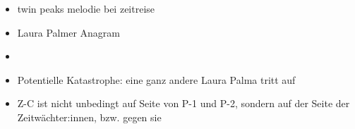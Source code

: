 \begin{itemize}
  \item twin peaks melodie bei zeitreise
  \item Laura Palmer Anagram
  \item {}
  \item Potentielle Katastrophe: eine ganz andere Laura Palma tritt auf
  \item Z-C ist nicht unbedingt auf Seite von P-1 und P-2, sondern auf der Seite der Zeitwächter:innen, bzw. gegen sie
\end{itemize}
